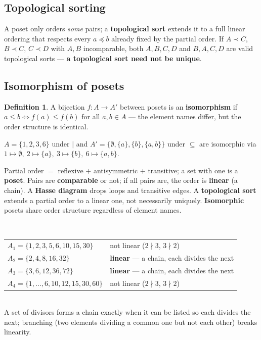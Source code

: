 \documentclass{fkt-notes}
\theoremstyle{definition}
\newtheorem*{defn}{Definition}
\begin{document}
\subsection{Topological sorting}
%
A poset only orders \emph{some} pairs; a \textbf{topological sort}
extends it to a full linear ordering that respects every $a\preceq b$
already fixed by the partial order. If $A\prec C$, $B\prec C$,
$C\prec D$ with $A,B$ incomparable, both $A,B,C,D$ and $B,A,C,D$ are
valid topological sorts --- \textbf{a topological sort need not be
  unique}.

\subsection{Isomorphism of posets}
%
\begin{defn}
  A bijection $f:A\to A'$ between posets is an \textbf{isomorphism} if
  $a\le b\iff f(a)\le f(b)$ for all $a,b\in A$ --- the element names
  differ, but the order structure is identical.
\end{defn}
\begin{example}[6.1 Ex.~17]
  $A=\{1,2,3,6\}$ under $\mid$ and $A'=\{\emptyset,\{a\},\{b\},\{a,b\}\}$
  under $\subseteq$ are isomorphic via
  $1\mapsto\emptyset,\ 2\mapsto\{a\},\ 3\mapsto\{b\},\ 6\mapsto\{a,b\}$.
\end{example}

\begin{keybox}[title=Key points]
  Partial order $=$ reflexive $+$ antisymmetric $+$ transitive; a set
  with one is a \textbf{poset}. Pairs are \textbf{comparable} or not; if
  all pairs are, the order is \textbf{linear} (a chain). A \textbf{Hasse
    diagram} drops loops and transitive edges. A \textbf{topological
    sort} extends a partial order to a linear one, not necessarily
  uniquely. \textbf{Isomorphic} posets share order structure regardless
  of element names.
\end{keybox}

\begin{example}\leavevmode\\[2pt]
  \begin{tabular}[t]{@{}ll@{}}
    $A_1=\{1,2,3,5,6,10,15,30\}$       & not linear ($2\nmid3$, $3\nmid2$)                  \\
    $A_2=\{2,4,8,16,32\}$              & \textbf{linear} --- a chain, each divides the next \\
    $A_3=\{3,6,12,36,72\}$             & \textbf{linear} --- a chain, each divides the next \\
    $A_4=\{1,\dots,6,10,12,15,30,60\}$ & not linear ($2\nmid3$, $3\nmid2$)
  \end{tabular}\\[2pt]
  A set of divisors forms a chain exactly when it can be listed so each
  divides the next; branching (two elements dividing a common one but
  not each other) breaks linearity.
\end{example}
\end{document}
